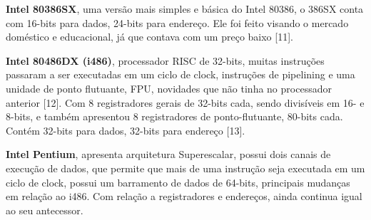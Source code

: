 \documentclass[12pt]{article}
\begin{document}
	 \textbf{Intel 80386SX}, uma versão mais simples e básica do Intel 80386, o 386SX conta com 16-bits para dados, 24-bits para endereço. Ele foi feito visando o mercado doméstico e educacional, já que contava com um preço baixo [11]. \
	 
	 \textbf{Intel 80486DX (i486)}, processador RISC de 32-bits, muitas instruções passaram a ser executadas em um ciclo de clock, instruções de pipelining e uma unidade de ponto flutuante, FPU, novidades que não tinha no processador anterior [12]. Com 8 registradores gerais de 32-bits cada, sendo divisíveis em 16- e 8-bits, e também apresentou 8 registradores de ponto-flutuante, 80-bits cada. Contém 32-bits para dados, 32-bits para endereço [13]. \
	 
	 \textbf{Intel Pentium}, apresenta arquitetura Superescalar, possui dois canais de execução de dados, que permite que mais de uma instrução seja executada em um ciclo de clock, possui um barramento de dados de 64-bits, principais mudanças em relação ao i486. Com relação a registradores e endereços, ainda continua igual ao seu antecessor.
\newpage
\end{document}
